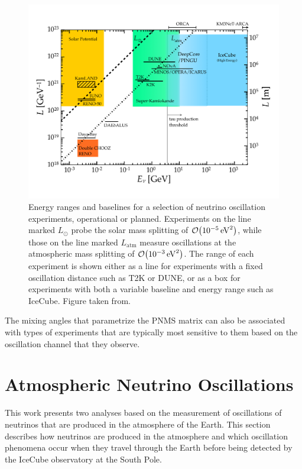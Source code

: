\begin{figure}
    \centering
    \includegraphics{figures/theory/LvsE.pdf}
    \caption{Energy ranges and baselines for a selection of neutrino oscillation experiments, operational or planned. Experiments on the line marked $L_{\odot}$ probe the solar mass splitting of $\order{\SI{e-5}{eV^2}}$, while those on the line marked $L_\mathrm{atm}$ measure oscillations at the atmospheric mass splitting of $\order{\SI{e-3}{eV^2}}$. The range of each experiment is shown either as a line for experiments with a fixed oscillation distance such as T2K or DUNE, or as a box for experiments with both a variable baseline and energy range such as IceCube. Figure taken from\cite{IceCube:2016xxt}.\label{fig:oscillation-experiments-overview}}
\end{figure}

The mixing angles that parametrize the PNMS matrix can also be associated with types of experiments that are typically most sensitive to them based on the oscillation channel that they observe. 


\section{Atmospheric Neutrino Oscillations}
This work presents two analyses based on the measurement of oscillations of neutrinos that are produced in the atmosphere of the Earth. This section describes how neutrinos are produced in the atmosphere and which oscillation phenomena occur when they travel through the Earth before being detected by the IceCube observatory at the South Pole.

